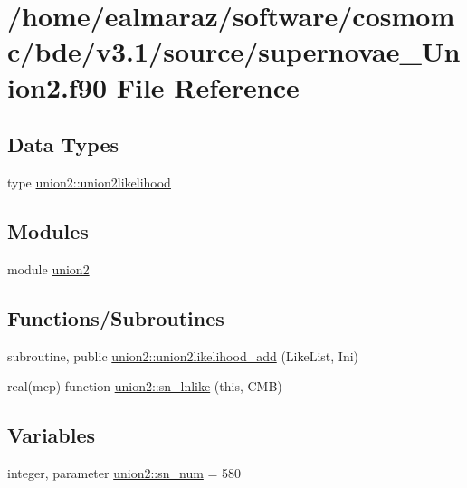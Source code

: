 \hypertarget{supernovae__Union2_8f90}{}\section{/home/ealmaraz/software/cosmomc/bde/v3.1/source/supernovae\+\_\+\+Union2.f90 File Reference}
\label{supernovae__Union2_8f90}
\subsection*{Data Types}
\begin{DoxyCompactItemize}
\item 
type \mbox{\hyperlink{structunion2_1_1union2likelihood}{union2\+::union2likelihood}}
\end{DoxyCompactItemize}
\subsection*{Modules}
\begin{DoxyCompactItemize}
\item 
module \mbox{\hyperlink{namespaceunion2}{union2}}
\end{DoxyCompactItemize}
\subsection*{Functions/\+Subroutines}
\begin{DoxyCompactItemize}
\item 
subroutine, public \mbox{\hyperlink{namespaceunion2_a1a2bf6931cf4fb87b54c8c327d598f48}{union2\+::union2likelihood\+\_\+add}} (Like\+List, Ini)
\item 
real(mcp) function \mbox{\hyperlink{namespaceunion2_a250c916120b646c5cda938be6828a432}{union2\+::sn\+\_\+lnlike}} (this, C\+MB)
\end{DoxyCompactItemize}
\subsection*{Variables}
\begin{DoxyCompactItemize}
\item 
integer, parameter \mbox{\hyperlink{namespaceunion2_a263e630a36e6cdb0d23c6982c2d13b8e}{union2\+::sn\+\_\+num}} = 580
\end{DoxyCompactItemize}
